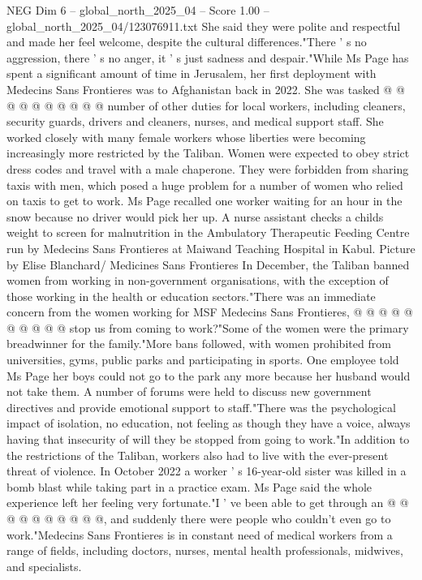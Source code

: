 \begin{textsample}{NEG Dim 6 – global\_north\_2025\_04 – Score 1.00 – global\_north\_2025\_04/123076911.txt}
She said they were polite and respectful and made her feel welcome, despite the cultural differences."There ' s no aggression, there ' s no anger, it ' s just sadness and despair."While Ms Page has spent a significant amount of time in Jerusalem, her first deployment with Medecins Sans Frontieres was to Afghanistan back in 2022.
She was tasked @ @ @ @ @ @ @ @ @ @ number of other duties for local workers, including cleaners, security guards, drivers and cleaners, nurses, and medical support staff.
She worked closely with many female workers whose liberties were becoming increasingly more restricted by the Taliban.
Women were expected to obey strict dress codes and travel with a male chaperone.
They were forbidden from sharing taxis with men, which posed a huge problem for a number of women who relied on taxis to get to work.
Ms Page recalled one worker waiting for an hour in the snow because no driver would pick her up.
A nurse assistant checks a childs weight to screen for malnutrition in the Ambulatory Therapeutic Feeding Centre run by Medecins Sans Frontieres at Maiwand Teaching Hospital in Kabul.
Picture by Elise Blanchard/ Medicines Sans Frontieres In December, the Taliban banned women from working in non-government organisations, with the exception of those working in the health or education sectors."There was an immediate concern from the women working for MSF Medecins Sans Frontieres, @ @ @ @ @ @ @ @ @ @ stop us from coming to work?"Some of the women were the primary breadwinner for the family."More bans followed, with women prohibited from universities, gyms, public parks and participating in sports.
One employee told Ms Page her boys could not go to the park any more because her husband would not take them.
A number of forums were held to discuss new government directives and provide emotional support to staff."There was the psychological impact of isolation, no education, not feeling as though they have a voice, always having that insecurity of will they be stopped from going to work."In addition to the restrictions of the Taliban, workers also had to live with the ever-present threat of violence.
In October 2022 a worker ' s 16-year-old sister was killed in a bomb blast while taking part in a practice exam.
Ms Page said the whole experience left her feeling very fortunate."I ' ve been able to get through an @ @ @ @ @ @ @ @ @ @, and suddenly there were people who couldn't even go to work."Medecins Sans Frontieres is in constant need of medical workers from a range of fields, including doctors, nurses, mental health professionals, midwives, and specialists.

\end{textsample}
